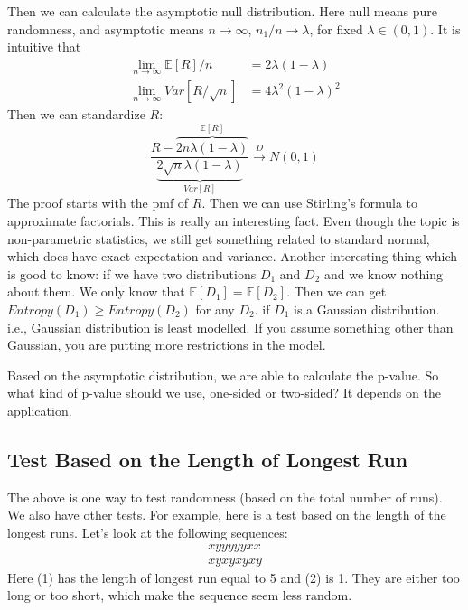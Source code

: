 \documentclass[twoside]{article}
\begin{document}
	Then we can calculate the asymptotic null distribution. Here null means pure randomness, and asymptotic means $n \to \infty$, $n_1/n \to \lambda$, for fixed $\lambda \in (0,1)$. It is intuitive that
	\begin{align*}
		\lim_{n \to \infty} \mathbb{E} [R]/n &= 2 \lambda (1 - \lambda) \\
		\lim_{n \to \infty} Var [R / \sqrt{n}] &= 4 \lambda^2 (1 - \lambda)^2
	\end{align*}
	Then we can standardize $R$:
	$$
	\frac{R - \overbrace{2 n \lambda (1 - \lambda)}^{\mathbb{E} [R]}}{\underbrace{2 \sqrt{n} \lambda (1 - \lambda)}_{Var [R]}} \xrightarrow{D} N(0,1)
	$$
	The proof starts with the pmf of $R$. Then we can use Stirling's formula to approximate factorials. This is really an interesting fact. Even though the topic is non-parametric statistics, we still get something related to standard normal, which does have exact expectation and variance. Another interesting thing which is good to know: if we have two distributions $D_1$ and $D_2$ and we know nothing about them. We only know that $\mathbb{E} [D_1] = \mathbb{E} [D_2]$. Then we can get $Entropy(D_1) \geqslant Entropy(D_2)$ for any $D_2$. if $D_1$ is a Gaussian distribution. i.e., Gaussian distribution is least modelled. If you assume something other than Gaussian, you are putting more restrictions in the model. 
	
	Based on the asymptotic distribution, we are able to calculate the p-value. So what kind of p-value should we use, one-sided or two-sided? It depends on the application. 
	
	\subsection{Test Based on the Length of Longest Run}
	The above is one way to test randomness (based on the total number of runs). We also have other tests. For example, here is a test based on the length of the longest runs. Let's look at the following sequences: 
	\begin{align}
		xyyyyyxx \tag{1}\\
		xyxyxyxy \tag{2}
	\end{align}
	Here (1) has the length of longest run equal to 5 and (2) is 1. They are either too long or too short, which make the sequence seem less random. 
	
\end{document}
